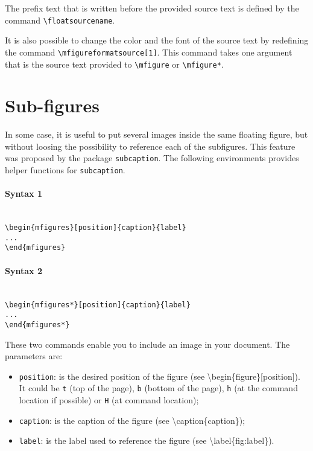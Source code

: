 \documentclass[book,taskpackage,specpackage,codepackage]{upmethodology-document}
\begin{document}
The prefix text that is written before the provided source text is defined by the command \texttt{{\textbackslash}floatsourcename}.

It is also possible to change the color and the font of the source text by redefining the command \texttt{{\textbackslash}mfigureformatsource[1]}. This command takes one argument that is the source text provided to \texttt{{\textbackslash}mfigure} or \texttt{{\textbackslash}mfigure*}.

\section{Sub-figures}

In some case, it is useful to put several images inside the same floating figure, but without loosing the possibility to reference each of the subfigures. This feature was proposed by the package \texttt{subcaption}. The following environments provides helper functions for \texttt{subcaption}.

\paragraph{Syntax 1} \mbox{}\\
\texttt{{\textbackslash}begin\{mfigures\}[position]\{caption\}\{label\}\\
...\\
{\textbackslash}end\{mfigures\}}

\paragraph{Syntax 2} \mbox{}\\
\texttt{{\textbackslash}begin\{mfigures*\}[position]\{caption\}\{label\}\\
...\\
{\textbackslash}end\{mfigures*\}}

These two commands enable you to include an image in your document. The parameters are:
\begin{itemize}
\item \texttt{position}: is the desired position of the figure (see {\textbackslash}begin\{figure\}[position]). It could be \texttt{t} (top of the page), \texttt{b} (bottom of the page), \texttt{h} (at the command location if possible) or \texttt{H} (at command location);

\item \texttt{caption}: is the caption of the figure (see {\textbackslash}caption\{caption\});

\item \texttt{label}: is the label used to reference the figure (see {\textbackslash}label\{fig:label\}).
\end{itemize}
\end{document}
